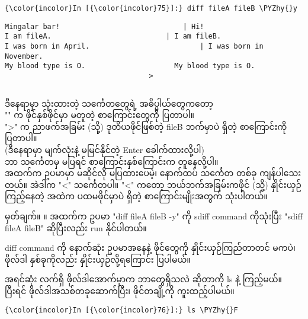 \documentclass[11pt]{article}
\def\PYZhy{\char`\-}
\begin{document}
    \begin{Verbatim}[commandchars=\\\{\}]
{\color{incolor}In [{\color{incolor}75}]:} diff fileA fileB \PYZhy{}y
\end{Verbatim}

    \begin{Verbatim}[commandchars=\\\{\}]
Mingalar bar!						      |	Hi!
I am fileA.						      |	I am fileB.
I was born in April.					      |	I was born in November.
My blood type is O.						My blood type is O.
							      >

    \end{Verbatim}

    \begin{Verbatim}[commandchars=\\\{\}]

    \end{Verbatim}

    ဒီနေရာမှာ သုံးထားတဲ့ သင်္ကေတတွေရဲ့ အဓိပ္ပါယ်တွေကတော့\\
"\textbar{}" က ဖိုင်နှစ်ဖိုင်မှာ မတူတဲ့ စာကြောင်းတွေကို ပြတာပါ။\\
"\textgreater{}" က ညာဖက်အခြမ်း (သို့) ဒုတိယဖိုင်ဖြစ်တဲ့ fileB ဘက်မှာပဲ
ရှိတဲ့ စာကြောင်းကို ပြတာပါ။\\
(ဒီနေရာမှာ မျက်လုံးနဲ့ မမြင်နိုင်တဲ့ Enter ခေါက်ထားလို့ပါ)\\
ဘာ သင်္ကေတမှ မပြရင် စာကြောင်းနှစ်ကြောင်းက တူနေလို့ပါ။\\
အထက်က ဥပမာမှာ မဆိုင်လို မပြထားပေမဲ့၊ နောက်ထပ် သင်္ကေတ တစ်ခု
ကျန်ပါသေးတယ်။ အဲဒါက "\textless{}" သင်္ကေတပါ။ "\textless{}" ကတော့
ဘယ်ဘက်အခြမ်းကဖိုင် (သို့) နှိုင်းယှဉ်ကြည့်နေတဲ့ အထဲက ပထမဖိုင်မှာပဲ
ရှိတဲ့ စာကြောင်းမျိုးအတွက် သုံးပါတယ်။

မှတ်ချက်။ ။ အထက်က ဥပမာ "diff fileA fileB -y" ကို sdiff command
ကိုသုံးပြီး "sdiff fileA fileB" ဆိုပြီးလည်း run နိုင်ပါတယ်။

diff command ကို နောက်ဆုံး ဥပမာအနေနဲ့ ဖိုင်တွေကို နှိုင်းယှဉ်ကြည်တာတင်
မကပဲ၊ ဖိုလ်ဒါ နှစ်ခုကိုလည်း နှိုင်းယှဉ်လို့ရကြောင်း ပြပါမယ်။

အရင်ဆုံး လက်ရှိ ဖိုလ်ဒါအောက်မှာက ဘာတွေရှိသလဲ ဆိုတာကို ls နဲ့ ကြည့်မယ်။\\
ပြီးရင် ဖိုလ်ဒါအသစ်တခုဆောက်ပြီး၊ ဖိုင်တချို့ကို ကူးထည့်ပါမယ်။

    \begin{Verbatim}[commandchars=\\\{\}]
{\color{incolor}In [{\color{incolor}76}]:} ls \PYZhy{}F
\end{Verbatim}
\end{document}
